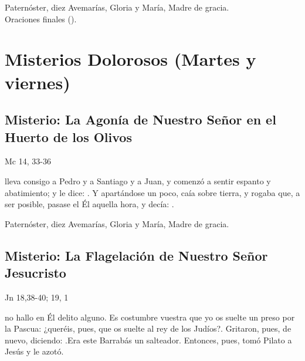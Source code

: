 \documentclass[10pt,a4paper,oneside]{book}
\newcounter{sorrowful-counter}
\begin{document}
\begin{center}
      Paternóster, diez Avemarías, Gloria y María, Madre de gracia.\\
      Oraciones finales ().
\end{center}


\section*{Misterios Dolorosos (Martes y viernes)}

\subsection*{ Misterio: La Agonía de Nuestro Señor en el Huerto de los Olivos}
\begin{flushright}
      {\color{red}Mc 14, 33-36}
\end{flushright}
 lleva consigo a Pedro y a Santiago y a Juan, y comenzó a sentir espanto y abatimiento; y le dice: . Y apartándose un poco, caía sobre tierra, y rogaba que, a ser posible, pasase el Él aquella hora, y decía: .

\begin{center}
      Paternóster, diez Avemarías, Gloria y María, Madre de gracia.
\end{center}

\subsection*{ Misterio: La Flagelación de Nuestro Señor Jesucristo}
\begin{flushright}
      {\color{red}Jn 18,38-40; 19, 1}
\end{flushright}
 no hallo en Él delito alguno. Es costumbre vuestra que yo os suelte un preso por la Pascua: ¿queréis, pues, que os suelte al rey de los Judíos?{\guillemotright}.
Gritaron, pues, de nuevo, diciendo: .Era este Barrabás un salteador. Entonces, pues, tomó Pilato a Jesús y le azotó.
\end{document}
